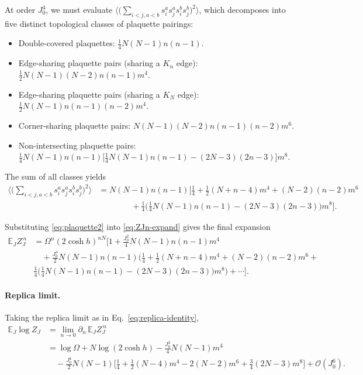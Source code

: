 \documentclass{article}
\theoremstyle{plain}
\begin{document}
At order \(J_0^4\), we must evaluate
\(
\big\langle
\big(\sum_{i<j,a<b}s_i^a s_j^a s_i^b s_j^b\big)^2
\big\rangle
\),
which decomposes into five distinct topological classes of plaquette pairings:
\begin{itemize}
\item[(A)] Double-covered plaquettes:
\(\tfrac{1}{4}N(N-1)n(n-1)\).
\item[(B)] Edge-sharing plaquette pairs (sharing a $K_n$ edge):
\(\tfrac{1}{2}N(N-1)(N-2)n(n-1)m^4\).
\item[(B$'$)] Edge-sharing plaquette pairs (sharing a $K_N$ edge):
\(\tfrac{1}{2}N(N-1)n(n-1)(n-2)m^4\).
\item[(C)] Corner-sharing plaquette pairs:
\(N(N-1)(N-2)n(n-1)(n-2)m^6\).
\item[(D)] Non-intersecting plaquette pairs:
\(\tfrac{1}{4}N(N-1)n(n-1)
\big[\tfrac{1}{4}N(N-1)n(n-1)-(2N-3)(2n-3)\big]m^8\).
\end{itemize}
The sum of all classes yields
\begin{align}
\Big\langle
\Big(\sum_{i<j,a<b}s_i^a s_j^a s_i^b s_j^b\Big)^2
\Big\rangle
&= N(N-1)n(n-1)
\Big[
\tfrac{1}{4} + \tfrac{1}{2}(N+n-4)m^4 + (N-2)(n-2)m^6 \nonumber\\
&\qquad\qquad
+ \tfrac{1}{4}\big(\tfrac{1}{4}N(N-1)n(n-1)-(2N-3)(2n-3)\big)m^8
\Big].
\label{eq:plaquette2}
\end{align}

Substituting \eqref{eq:plaquette2} into \eqref{eq:ZJn-expand} gives the final expansion
\begin{align}
\mathbb{E}_J Z_J^{\,n}
&= \Omega^{n}(2\cosh h)^{nN}
\Big[
1 + \tfrac{J_0^2}{4} N(N-1)n(n-1)m^4 \nonumber\\
&\quad
+ \tfrac{J_0^4}{2} N(N-1)n(n-1)
\Big(
\tfrac{1}{4} + \tfrac{1}{2}(N+n-4)m^4 + (N-2)(n-2)m^6
+ \\
&\tfrac{1}{4}\big(\tfrac{1}{4}N(N-1)n(n-1)-(2N-3)(2n-3)\big)m^8
\Big)
+ \cdots
\Big].
\label{eq:ZJn-final}
\end{align}

\paragraph{Replica limit.}
Taking the replica limit as in Eq.~\eqref{eq:replica-identity},
\begin{align}
\mathbb{E}_J \log Z_J
&= \lim_{n\to 0}\partial_n\,\mathbb{E}_J Z_J^{\,n} \nonumber\\
&= \log \Omega + N \log(2\cosh h)
- \frac{J_0^2}{4}N(N-1)m^4 \nonumber\\
&\quad
- \frac{J_0^4}{2}N(N-1)
\Big[
\tfrac{1}{4} + \tfrac{1}{2}(N-4)m^4
- 2(N-2)m^6 + \tfrac{3}{4}(2N-3)m^8
\Big]
+ \mathcal{O}(J_0^6).
\label{eq:logZJ-final}
\end{align}
\end{document}

